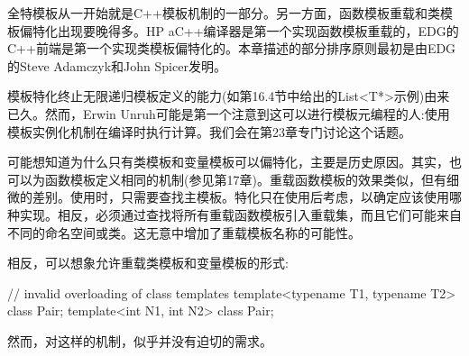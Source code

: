 全特模板从一开始就是C++模板机制的一部分。另一方面，函数模板重载和类模板偏特化出现要晚得多。HP aC++编译器是第一个实现函数模板重载的，EDG的C++前端是第一个实现类模板偏特化的。本章描述的部分排序原则最初是由EDG的Steve Adamczyk和John Spicer发明。

模板特化终止无限递归模板定义的能力(如第16.4节中给出的List<T*>示例)由来已久。然而，Erwin Unruh可能是第一个注意到这可以进行模板元编程的人:使用模板实例化机制在编译时执行计算。我们会在第23章专门讨论这个话题。

可能想知道为什么只有类模板和变量模板可以偏特化，主要是历史原因。其实，也可以为函数模板定义相同的机制(参见第17章)。重载函数模板的效果类似，但有细微的差别。使用时，只需要查找主模板。特化只在使用后考虑，以确定应该使用哪种实现。相反，必须通过查找将所有重载函数模板引入重载集，而且它们可能来自不同的命名空间或类。这无意中增加了重载模板名称的可能性。

相反，可以想象允许重载类模板和变量模板的形式:

\begin{cpp}
// invalid overloading of class templates
template<typename T1, typename T2> class Pair;
template<int N1, int N2> class Pair;
\end{cpp}

然而，对这样的机制，似乎并没有迫切的需求。
